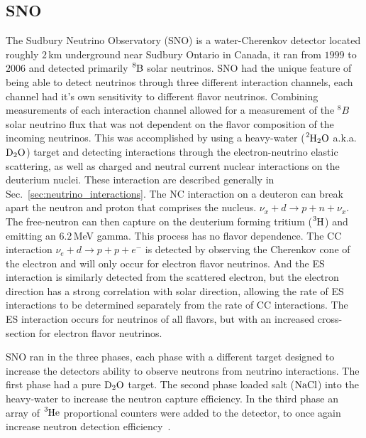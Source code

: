 \subsection{SNO}
\label{sec:sno}
The Sudbury Neutrino Observatory (SNO) is a water-Cherenkov detector located
roughly $2$\,km underground near Sudbury Ontario in Canada, it ran from
$1999$ to $2006$ and detected primarily $\ce{^{8}B}$ solar neutrinos.
SNO had the unique feature of
being able to detect neutrinos through three different interaction channels,
each channel had it's own sensitivity to different flavor neutrinos.
Combining measurements of each interaction channel allowed for a measurement of the $^8B$
solar neutrino flux that was not dependent on the flavor composition of the
incoming neutrinos.
This was accomplished by using a heavy-water ($\ce{^{2}H_{2}O}$ a.k.a. $\ce{D_{2}O}$) target and
detecting interactions through the electron-neutrino elastic scattering,
as well as charged and neutral current nuclear interactions on the deuterium
nuclei.
These interaction are described generally in Sec.~\ref{sec:neutrino_interactions}.
The NC interaction on a deuteron can break apart the neutron and proton
that comprises the nucleus. $\nu_{x} + d \rightarrow p + n + \nu_{x}$.
The free-neutron can then capture on the deuterium forming tritium ($\ce{^{3}H}$)
and emitting an $6.2$\,MeV gamma.
This process has no flavor dependence.
The CC interaction $\nu_{e} + d \rightarrow p + p + e^{-}$
is detected by observing the Cherenkov cone of the electron and will only
occur for electron flavor neutrinos.
And the ES interaction is similarly detected from the scattered electron,
but the electron direction has a strong correlation with solar direction,
allowing the rate of ES interactions to be determined separately from the
rate of CC interactions.
The ES interaction occurs for neutrinos of all flavors, but with an increased
cross-section for electron flavor neutrinos.

SNO ran in the three phases, each phase with a different target
designed to increase the detectors ability to observe neutrons from neutrino
interactions.
The first phase had a pure $\ce{D_{2}O}$ target.
 The second phase loaded salt ($\ce{NaCl}$) into the heavy-water to increase
the neutron capture efficiency.
In the third phase an array of $\ce{^{3}He}$ proportional counters were added
to the detector, to once again increase neutron detection efficiency~\cite{sno_review}.

